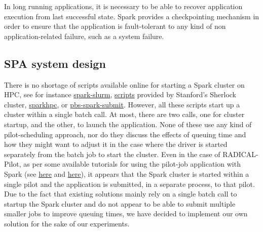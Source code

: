 \documentclass{IEEEtran}
\begin{document}
    In long running applications, it is necessary to be able to recover application execution from
    last successful state. Spark provides a checkpointing mechanism in order to ensure that the application
    is fault-tolerant to any kind of non application-related failure, such as a system failure.

    \subsection{SPA system design}

    There is no shortage of scripts available online for starting a Spark cluster on HPC, 
    see for instance \href{https://github.com/NIH-HPC/spark-slurm}{spark-slurm},
    \href{https://www.sherlock.stanford.edu/docs/software/using/spark}{scripts} provided
     by Stanford's Sherlock cluster, \href{https://sparkhpc.readthedocs.io}{sparkhpc},
     or \href{https://www.osc.edu/~troy/pbstools/man/pbs-spark-submit}{pbs-spark-submit}.
    However, all these scripts start up a cluster within a single batch call. At most, there are two calls, one for
    cluster startup,
    and the other, to launch the application. None of these use any kind of pilot-scheduling approach, nor do they discuss the
    effects of queuing time and how they might want to adjust it in the
    case where the driver is started separately from the batch job to start
    the cluster. Even in the case of RADICAL-Pilot, as per some available
    tutorials for using the pilot-job application with
    Spark (see
    \href{https://github.com/radical-cybertools/pilot-streaming/blob/master/examples/Pilot-Streaming-GettingStarted.ipynb}{here}
    and \href{https://github.com/radical-cybertools/MIDAS-tutorial/blob/master/pilot/Pilot-Spark.ipynb}{here}),
    it appears that the Spark cluster is started within a single pilot and
    the application is submitted, in a separate process, to that pilot. Due
    to the fact that existing solutions mainly rely on a single batch call
    to startup the Spark cluster and do not appear to be able to submit
    multiple smaller jobs to improve queuing times, we have decided to
    implement our own solution for the sake of our experiments.
\end{document}
